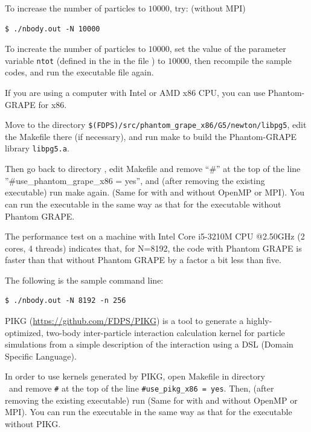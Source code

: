 \ifCpp %
To increase the number of particles to $10000$, try:
(without MPI)
\begin{screen}
\begin{verbatim}
$ ./nbody.out -N 10000
\end{verbatim}
\end{screen}
\endifCpp
\ifIF %
To increate the number of particles to $10000$, set the value of the parameter variable \texttt{ntot} (defined in the \procedure \mainFuncName in the file \fileNameOfMainFunc) to $10000$, then recompile the sample codes, and run the executable file again.
\endifIF



\label{s3sec:phantom_grape_x86}
If you are using a computer with Intel or AMD x86 CPU, you can use Phantom-GRAPE for x86.

Move to the directory \texttt{\$(FDPS)/src/phantom\_grape\_x86/G5/newton/libpg5}, edit the Makefile there (if necessary), and run make to build the Phantom-GRAPE library \texttt{libpg5.a}.

Then go back to directory \dirNameNbodySample, edit Makefile and remove ``\#'' at the top of the line \\''\#use\_phantom\_grape\_x86 = yes'', and (after removing the existing executable) run make again. (Same for with and without OpenMP or MPI). You can run the executable in the same way as that for the executable without Phantom GRAPE.

The performance test on a machine with Intel Core i5-3210M CPU @2.50GHz (2 cores, 4 threads) indicates that, for N=8192, the code with Phantom GRAPE is faster than that without Phantom GRAPE by a factor a bit less than five.

\ifCpp %
The following is the sample command line:
\begin{screen}
\begin{verbatim}
$ ./nbody.out -N 8192 -n 256
\end{verbatim}
\end{screen}
\endifCpp

\label{s3sec:pikg}
PIKG (\url{https://github.com/FDPS/PIKG}) is a tool to generate a highly-optimized, two-body inter-particle interaction calculation kernel for particle simulations from a simple description of the interaction using a DSL (Domain Specific Language).

In order to use kernels generated by PIKG, open Makefile in directory \\
\dirNameNbodySample\  and remove \texttt{\#} at the top of the line \texttt{\#use\_pikg\_x86 = yes}. Then, (after removing the existing executable) run
(Same for with and without OpenMP or MPI). You can run the executable in the same way as that for the executable without PIKG.

